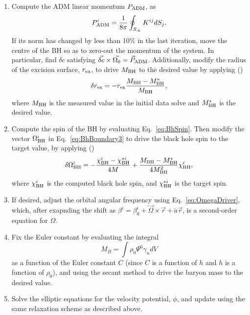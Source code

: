 \begin{enumerate}
\item Compute the ADM linear momentum $P_{\rm ADM}$, as 
\begin{equation}
P_{\rm ADM}^i = \frac{1}{8\pi}\oint_{S_{\infty}}K^{ij}dS_j.
\end{equation}
If its norm has changed by less than 10\% in the last iteration, move
the centre of the BH so as to zero-out the momentum of the
system. In particular, find $\delta c$ satisfying $\vec{\delta c}
\times \vec{\Omega_0}=\vec{P}_{\rm ADM}$. Additionally, modify the
radius of the excision surface, $r_{\rm ex}$, to
drive $M_{\rm BH}$ to the desired value by applying (\cite{Buchman:2012dw})
\begin{equation}
\delta r_{\rm ex} = -r_{\rm ex} \frac{M_{\rm BH} - M_{\rm
    BH}^{*}}{M_{\rm BH}},
\end{equation}
where $M_{\rm BH}$ is the measured value in the initial data solve and
$M_{\rm BH}^{*}$ is the desired value.

\item Compute the spin of the BH by evaluating Eq.~\ref{eq:BhSpin}. Then
  modify the vector $\Omega^i_{\rm BH}$ in Eq.~\ref{eq:BhBoundary3} to drive
  the black hole spin to the target value,  by applying (\cite{Buchman:2012dw})
\begin{equation}
\delta \Omega_{\rm BH}^i = -\frac{\chi^i_{\rm BH}-\chi_{\rm
    BH}^{*i}}{4M}+\frac{M_{\rm BH}-M_{\rm BH}^{*}}{4M_{\rm
    BH}^2}\chi_{\rm BH}^i,
\end{equation}
where $\chi^i_{\rm BH}$ is the computed black hole spin, and $\chi_{\rm
    BH}^{*i}$ is the target spin.

\item
\label{it:omega}
 If desired, adjust the orbital angular frequency using
  Eq.~\ref{eq:OmegaDriver}, which, after exapnding the shift as 
$\beta^i=\beta^i_0 +
\vec{\Omega}\times\vec{r} + \dot{a}\vec{r}$, is a second-order
equation for $\Omega$.

\item Fix the Euler constant by evaluating the integral
\begin{equation}
M_{B}=\int \rho_0\Psi^6\gamma_ndV
\end{equation}
as a function of the Euler
constant $C$ (since $C$ is a function of $h$ and $h$ is a function of $\rho_0$), and using the secant method to drive the baryon mass to the
desired value.

\item Solve the elliptic equations for the velocity potential, $\phi$,
  and update using the same relaxation scheme as described above.


\end{enumerate}
